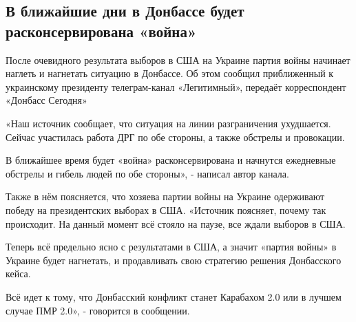  
 
 

\subsection{В ближайшие дни в Донбассе будет расконсервирована «война»}
\label{sec:06_11_2020.fb.lnr.1.vojna_donbass}

После очевидного результата выборов в США на Украине партия войны начинает
наглеть и нагнетать ситуацию в Донбассе. Об этом сообщил приближенный к
украинскому президенту телеграм-канал «Легитимный», передаёт корреспондент
«Донбасс Сегодня»

«Наш источник сообщает, что ситуация на линии разграничения ухудшается.  Сейчас
участилась работа ДРГ по обе стороны, а также обстрелы и провокации. 

В ближайшее время будет «война» расконсервирована и начнутся ежедневные
обстрелы и гибель людей по обе стороны», - написал автор канала.

Также в нём поясняется, что хозяева партии войны на Украине одерживают победу
на президентских выборах в США.  «Источник поясняет, почему так происходит. На
данный момент всё стояло на паузе, все ждали выборов в США. 

Теперь всё предельно ясно с результатами в США, а значит «партия войны» в
Украине будет нагнетать, и продавливать свою стратегию решения Донбасского
кейса.

Всё идет к тому, что Донбасский конфликт станет Карабахом 2.0 или в лучшем
случае ПМР 2.0», - говорится в сообщении.

